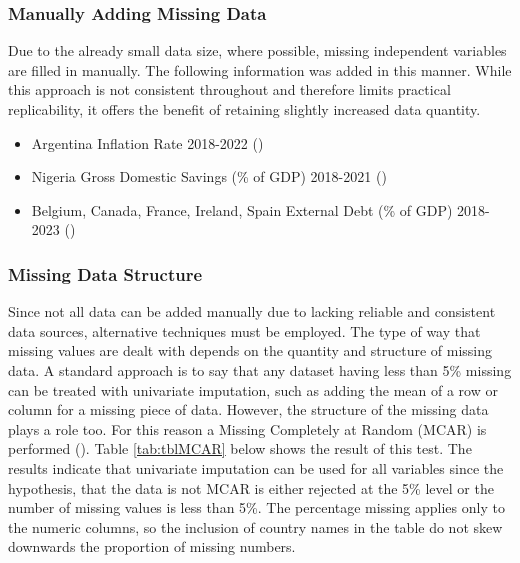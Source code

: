 \documentclass[
]{article}
\begin{document}
\subsubsection{Manually Adding Missing Data}\label{manually-adding-missing-data}

Due to the already small data size, where possible, missing independent variables are filled in manually. The following information was added in this manner. While this approach is not consistent throughout and therefore limits practical replicability, it offers the benefit of retaining slightly increased data quantity.

\begin{itemize}
\item
  Argentina Inflation Rate 2018-2022 ()
\item
  Nigeria Gross Domestic Savings (\% of GDP) 2018-2021 ()
\item
  Belgium, Canada, France, Ireland, Spain External Debt (\% of GDP) 2018-2023 ()
\end{itemize}

\subsubsection{Missing Data Structure}\label{missing-data-structure}

Since not all data can be added manually due to lacking reliable and consistent data sources, alternative techniques must be employed. The type of way that missing values are dealt with depends on the quantity and structure of missing data. A standard approach is to say that any dataset having less than 5\% missing can be treated with univariate imputation, such as adding the mean of a row or column for a missing piece of data. However, the structure of the missing data plays a role too. For this reason a Missing Completely at Random (MCAR) is performed (). Table \ref{tab:tblMCAR} below shows the result of this test. The results indicate that univariate imputation can be used for all variables since the hypothesis, that the data is not MCAR is either rejected at the 5\% level or the number of missing values is less than 5\%. The percentage missing applies only to the numeric columns, so the inclusion of country names in the table do not skew downwards the proportion of missing numbers.
\end{document}
